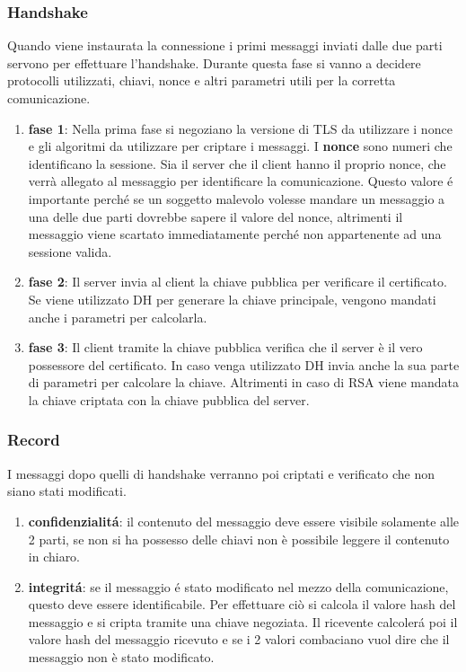 \subsubsection{Handshake}
Quando viene instaurata la connessione i primi messaggi inviati dalle due parti servono per effettuare l'handshake. Durante questa fase si vanno a decidere protocolli utilizzati, chiavi, nonce e altri parametri utili per la corretta comunicazione.
\begin{enumerate}
  \item \textbf{fase 1}: Nella prima fase si negoziano la versione di TLS da utilizzare i nonce e gli algoritmi da utilizzare per criptare i messaggi. I \textbf{nonce} sono numeri che identificano la sessione. Sia il server che il client hanno il proprio nonce, che verrà allegato al messaggio per identificare la comunicazione. Questo valore é importante perché se un soggetto malevolo volesse mandare un messaggio a una delle due parti dovrebbe sapere il valore del nonce, altrimenti il messaggio viene scartato immediatamente perché non appartenente ad una sessione valida.
  \item \textbf{fase 2}: Il server invia al client la chiave pubblica per verificare il certificato. Se viene utilizzato DH per generare la chiave principale, vengono mandati anche i parametri per calcolarla.
  \item \textbf{fase 3}: Il client tramite la chiave pubblica verifica che il server è il vero possessore del certificato. In caso venga utilizzato DH invia anche la sua parte di parametri per calcolare la chiave. Altrimenti in caso di RSA viene mandata la chiave criptata con la chiave pubblica del server.
\end{enumerate}
\subsubsection{Record}
I messaggi dopo quelli di handshake verranno poi criptati e verificato che non siano stati modificati.
\begin{enumerate}
\item \textbf{confidenzialitá}: il contenuto del messaggio deve essere visibile solamente alle 2 parti, se non si ha possesso delle chiavi non è possibile leggere il contenuto in chiaro.
\item \textbf{integritá}: se il messaggio é stato modificato nel mezzo della comunicazione, questo deve essere identificabile. Per effettuare ciò si calcola il valore hash del messaggio e si cripta tramite una chiave negoziata. Il ricevente calcolerá poi il valore hash del messaggio ricevuto e se i 2 valori combaciano vuol dire che il messaggio non è stato modificato.
\end{enumerate}

